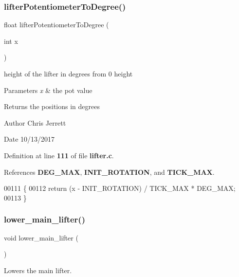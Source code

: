 \subsubsection{lifter\+Potentiometer\+To\+Degree()}
{\footnotesize\ttfamily float lifter\+Potentiometer\+To\+Degree (\begin{DoxyParamCaption}\item[{int}]{x }\end{DoxyParamCaption})}



height of the lifter in degrees from 0 height 


\begin{DoxyParams}{Parameters}
{\em x} & the pot value \\
\hline
\end{DoxyParams}
\begin{DoxyReturn}{Returns}
the positions in degrees 
\end{DoxyReturn}
\begin{DoxyAuthor}{Author}
Chris Jerrett 
\end{DoxyAuthor}
\begin{DoxyDate}{Date}
10/13/2017 
\end{DoxyDate}


Definition at line \textbf{ 111} of file \textbf{ lifter.\+c}.



References \textbf{ D\+E\+G\+\_\+\+M\+AX}, \textbf{ I\+N\+I\+T\+\_\+\+R\+O\+T\+A\+T\+I\+ON}, and \textbf{ T\+I\+C\+K\+\_\+\+M\+AX}.


\begin{DoxyCode}
00111                                         \{
00112   \textcolor{keywordflow}{return} (x - INIT_ROTATION) / TICK_MAX * DEG_MAX;
00113 \}
\end{DoxyCode}
\mbox{\label{lifter_8h_ad36c37086a91046af4e6f619618b7719}} 
\subsubsection{lower\+\_\+main\+\_\+lifter()}
{\footnotesize\ttfamily void lower\+\_\+main\+\_\+lifter (\begin{DoxyParamCaption}{ }\end{DoxyParamCaption})}



Lowers the main lifter. 

